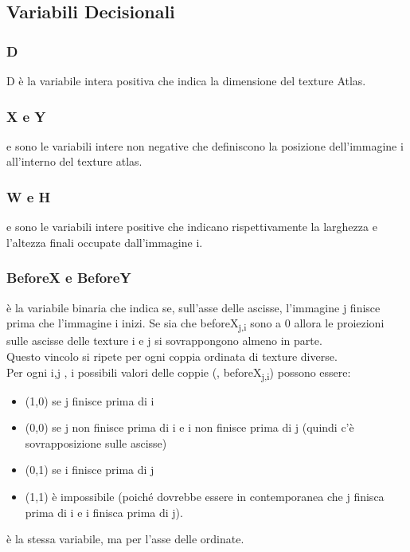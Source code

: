 \newcommand{\footFreedom}{L'utente in verità ha la libertà di usare queste variabili per mettere valori a piacere, non necessariamente potenze di 2.}

\newcommand{\footIsTSum}{Essendo variabili di uguaglianza su una stessa variabile D, questa somma può essere al massimo 1.}





\subsection{Variabili Decisionali}

\subsubsection{D}
D è la variabile intera positiva che indica la dimensione del texture Atlas.

\subsubsection{X e Y}
\Xi{} e \Yi{} sono le variabili intere non negative che definiscono la posizione dell'immagine i all'interno del texture atlas.

\subsubsection{W e H}
\Wi{} e \Hi{} sono le variabili intere positive che indicano rispettivamente la larghezza e l'altezza finali occupate dall'immagine i.


\subsubsection{BeforeX e BeforeY}



\beforeXij{} è la variabile binaria che indica se, sull'asse delle ascisse, l'immagine j finisce prima che l'immagine i inizi. Se sia \beforeXij{} che beforeX\textsubscript{j,i} sono a 0 allora le proiezioni sulle ascisse delle texture i e j si sovrappongono almeno in parte. \\
Questo vincolo si ripete per ogni coppia ordinata di texture diverse. \\
Per ogni i,j , i possibili valori delle coppie (\beforeXij, beforeX\textsubscript{j,i}) possono essere:
\begin{itemize}
	\itemsep0em
	\item (1,0) se j finisce prima di i
	\item (0,0) se j non finisce prima di i e i non finisce prima di j (quindi c'è sovrapposizione sulle ascisse)
	\item (0,1) se i finisce prima di j
	\item (1,1) è impossibile (poiché dovrebbe essere in contemporanea che j finisca prima di i e i finisca prima di j).
\end{itemize}
\beforeYij{} è la stessa variabile, ma per l'asse delle ordinate.


